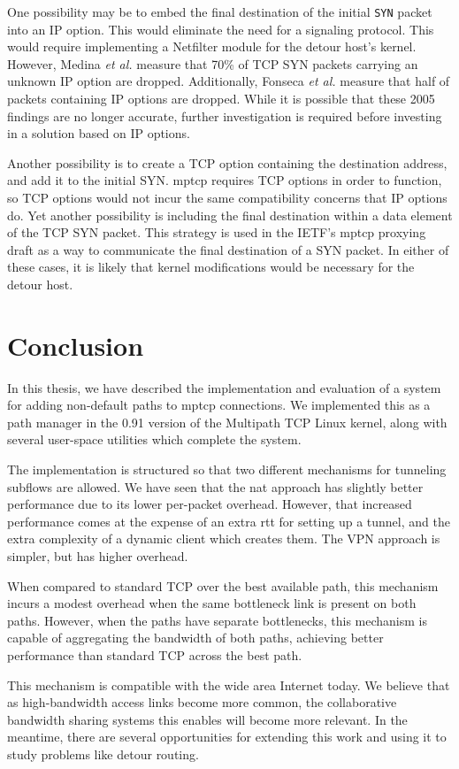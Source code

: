 \documentclass{cwru}
\begin{document}
One possibility may be to embed the final destination of the initial
\texttt{SYN} packet into an IP option. This would eliminate the need for a
signaling protocol. This would require implementing a Netfilter module for the
detour host's kernel. However, Medina \textit{et al.} \cite{medina2005measuring}
measure that 70\% of TCP SYN packets carrying an unknown IP option are dropped.
Additionally, Fonseca \textit{et al.} \cite{fonseca2005ip} measure that half of
packets containing IP options are dropped. While it is possible that these 2005
findings are no longer accurate, further investigation is required before
investing in a solution based on IP options.

Another possibility is to create a TCP option containing the destination
address, and add it to the initial SYN. \ac{mptcp} requires TCP options in order
to function, so TCP options would not incur the same compatibility concerns that
IP options do. Yet another possibility is including the final destination within
a data element of the TCP SYN packet. This strategy is used in the IETF's
\ac{mptcp} proxying draft \cite{boucadair-mptcp-plain-mode-10} as a way to
communicate the final destination of a SYN packet. In either of these cases, it
is likely that kernel modifications would be necessary for the detour host.

\chapter{Conclusion}
\label{c:conclusion}

In this thesis, we have described the implementation and evaluation of a system
for adding non-default paths to \ac{mptcp} connections. We implemented this as a
path manager in the 0.91 version of the Multipath TCP Linux kernel, along with
several user-space utilities which complete the system.

The implementation is structured so that two different mechanisms for tunneling
subflows are allowed. We have seen that the \ac{nat} approach has slightly
better performance due to its lower per-packet overhead. However, that increased
performance comes at the expense of an extra \ac{rtt} for setting up a tunnel,
and the extra complexity of a dynamic client which creates them. The VPN
approach is simpler, but has higher overhead.

When compared to standard TCP over the best available path, this mechanism
incurs a modest overhead when the same bottleneck link is present on both paths.
However, when the paths have separate bottlenecks, this mechanism is capable of
aggregating the bandwidth of both paths, achieving better performance than
standard TCP across the best path.

This mechanism is compatible with the wide area Internet today. We believe that
as high-bandwidth access links become more common, the collaborative bandwidth
sharing systems this enables will become more relevant. In the meantime, there
are several opportunities for extending this work and using it to study problems
like detour routing.

\backmatter
\appendix



\end{document}
